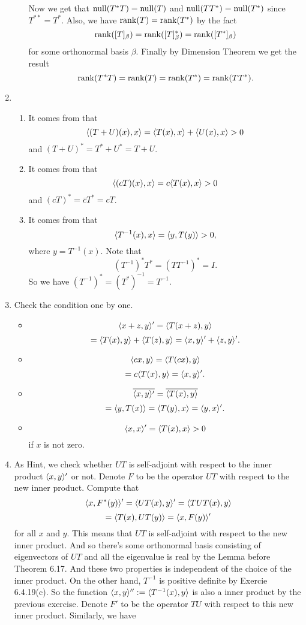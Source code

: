 \begin{enumerate}
\begin{enumerate}
Now we get that $\operatorname{null}(T^*T)=\operatorname{null}(T)$ and $\operatorname{null}(TT^*)=\operatorname{null}(T^*)$ since $T^{**}=T^*$. Also, we have $\operatorname{rank}(T)=\operatorname{rank}(T^*)$ by the fact 
\[\operatorname{rank}([T]_{\beta})=\operatorname{rank}([T]_{\beta}^*)=\operatorname{rank}([T^*]_{\beta})\]
for some orthonormal basis $\beta $. Finally by Dimension Theorem we get the result
\[\operatorname{rank}(T^*T)=\operatorname{rank}(T)=\operatorname{rank}(T^*)=\operatorname{rank}(TT^*).\]
\end{enumerate}
\item \begin{enumerate}
\item It comes from that 
\[\langle (T+U)(x),x\rangle =\langle T(x),x\rangle +\langle U(x),x\rangle >0\]
and $(T+U)^*=T^*+U^*=T+U$.
\item It comes from that 
\[\langle (cT)(x),x\rangle =c\langle T(x),x\rangle >0\]
and $(cT)^*=\overline{c}T^*=cT$.
\item It comes from that
\[\langle T^{-1}(x),x\rangle =\langle y,T(y)\rangle >0,\]
where $y=T^{-1}(x)$. Note that 
\[(T^{-1})^*T^*=(TT^{-1})^*=I.\]
So we have $(T^{-1})^*=(T^*)^{-1}=T^{-1}$.
\end{enumerate}
\item Check the condition one by one. \begin{itemize}
\item \[\langle x+z,y\rangle'=\langle T(x+z),y\rangle \]
\[=\langle T(x),y\rangle +\langle T(z),y\rangle =\langle x,y\rangle'+\langle z,y\rangle'.\]
\item \[\langle cx,y\rangle =\langle T(cx),y\rangle \]
\[=c\langle T(x),y\rangle =\langle x,y\rangle'.\]
\item \[\overline{\langle x,y\rangle' }=\overline{\langle T(x),y\rangle }\]
\[=\langle y,T(x)\rangle =\langle T(y),x\rangle =\langle y,x\rangle'.\]
\item \[\langle x,x\rangle'=\langle T(x),x\rangle >0\]
if $x$ is not zero.
\end{itemize}
\item As Hint, we check whether $UT$ is self-adjoint with respect to the inner product $\langle x,y\rangle'$ or not. Denote $F$ to be the operator $UT$ with respect to the new inner product. Compute that 
\[\langle x,F^*(y)\rangle'=\langle UT(x),y\rangle' =\langle TUT(x),y\rangle \]
\[=\langle T(x),UT(y)\rangle=\langle x,F(y)\rangle'\]
for all $x$ and $y$. This means that $UT$ is self-adjoint with respect to the new inner product. And so there's some orthonormal basis consisting of eigenvectors of $UT$ and all the eigenvalue is real by the Lemma before Theorem 6.17. And these two properties is independent of the choice of the inner product. On the other hand, $T^{-1}$ is positive definite by Exercie 6.4.19(c). So the function $\langle x,y\rangle'':=\langle T^{-1}(x),y\rangle $ is also a inner product by the previous exercise. Denote $F'$ to be the operator $TU$ with respect to this new inner product. Similarly, we have 

\end{enumerate}
